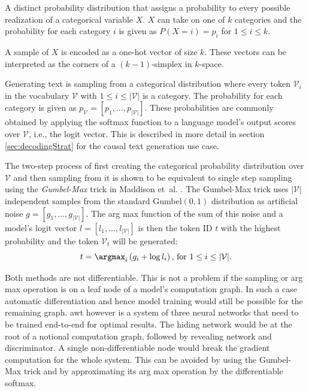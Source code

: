     \begin{definition}
        A distinct probability distribution that assigns a probability to every possible realization of a categorical variable $X$.
        $X$ can take on one of $k$ categories and the probability for each category $i$ is given as $P(X=i) = p_i$ for $1 \leq i \leq k$.

        A sample of $X$ is encoded as a one-hot vector of size $k$.
        These vectors can be interpreted as the corners of a $(k-1)$-simplex in $k$-space.
    \end{definition}

    Generating text is sampling from a categorical distribution where every token $\mathcal{V}_i$ in the vocabulary $\mathcal{V}$ with $1 \leq i \leq |\mathcal{V}|$ is a category.
    The probability for each category is given as $p_\mathcal{V} = [p_1, \dots, p_{|\mathcal{V}|}]$.
    These probabilities are commonly obtained by applying the softmax function to a language model's output scores over $\mathcal{V}$, i.e., the logit vector.
    This is described in more detail in section \ref{sec:decodingStrat} for the causal text generation use case.

    The two-step process of first creating the categorical probability distribution over $\mathcal{V}$ and then sampling from it is shown to be equivalent to single step sampling using the \emph{Gumbel-Max} trick in Maddison et~al. \cite{maddison2015a}.
    The Gumbel-Max trick uses $|\mathcal{V}|$ independent samples from the standard Gumbel$(0,1)$ distribution \cite{gumbel1954statistical} as artificial noise $g = [g_1, \dots, g_{|\mathcal{V}|}]$.
    The arg max function of the sum of this noise and a model's logit vector $l=[l_1, \dots, l_{|\mathcal{V}|}]$ is then the token ID $t$ with the highest probability and the token $\mathcal{V}_t$ will be generated:
    \begin{equation}
        t = \argmax_i \left( g_i + \log l_i \right) \text{, for $1 \leq i \leq |\mathcal{V}|$.}
    \end{equation}

    Both methods are not differentiable.
    This is not a problem if the sampling or arg max operation is on a leaf node of a model's computation graph.
    In such a case automatic differentiation and hence model training would still be possible for the remaining graph.
    \ac{awt} however is a system of three neural networks that need to be trained end-to-end for optimal results.
    The hiding network would be at the root of a notional computation graph, followed by revealing network and discriminator.
    A single non-differentiable node would break the gradient computation for the whole system.
    This can be avoided by using the Gumbel-Max trick and by approximating its arg max operation by the differentiable softmax. 

